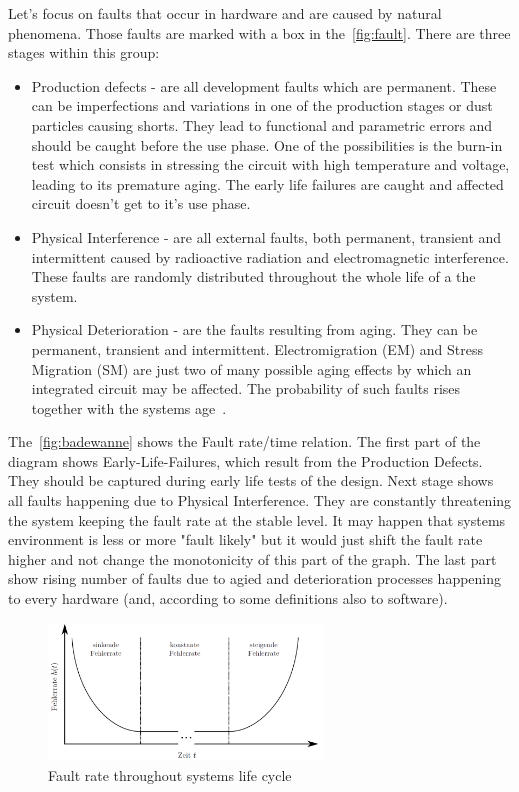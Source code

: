 Let's focus on faults that occur in hardware and are caused by natural phenomena. Those faults are marked with a box in the~\autoref{fig:fault}. There are three stages within this group:
\begin{itemize}
    \item Production defects - are all development faults which are permanent. These can be imperfections and variations in one of the production stages or dust particles causing shorts. They lead to functional and parametric errors and should be caught before the use phase. One of the possibilities is the burn-in test which consists in stressing the circuit with high temperature and voltage, leading to its premature aging. The early life failures are caught and affected circuit doesn't get to it's use phase.
    \item Physical Interference - are all external faults, both permanent, transient and intermittent caused by radioactive radiation and electromagnetic interference. These faults are randomly distributed throughout the whole life of a the system.
    \item Physical Deterioration - are the faults resulting from aging. They can be permanent, transient and intermittent. Electromigration (EM) and Stress Migration (SM) are just two of many possible aging effects by which an integrated circuit may be affected. The probability of such faults rises together with the systems age~\cite{art:Avizienis, art:Avizienis2}.
\end{itemize}
The~\autoref{fig:badewanne} shows the Fault rate/time relation. The first part of the diagram shows Early-Life-Failures, which result from the Production Defects. They should be captured during early life tests of the design. Next stage shows all faults happening due to Physical Interference. They are constantly threatening the system keeping the fault rate at the stable level. It may happen that systems environment is less or more "fault likely" but it would just shift the fault rate higher and not change the monotonicity of this part of the graph. The last part show rising number of faults due to agied and deterioration processes happening to every hardware (and, according to some definitions also to software).

\begin{figure}[H]
\centering
\includegraphics[width=0.65\textwidth]{figures/badewanne.png}
\caption{Fault rate throughout systems life cycle~\cite{art:Avizienis}}
\label{fig:badewanne}
\end{figure}


